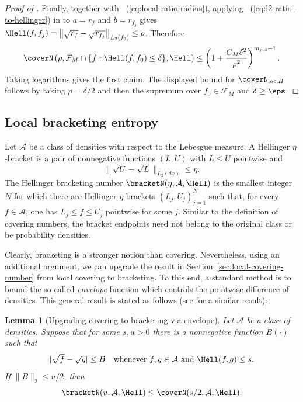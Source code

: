 \documentclass[letterpaper,11pt]{article}
\newcommand{\eqref}[1]{~(\ref{#1})}
\newcommand{\calF}{{\mathcal{F}}}
\newtheorem{lemma}[theorem]{Lemma}
\theoremstyle{definition}
\begin{document}
\begin{proof}[Proof of ]
Finally, together with \eqref{eq:local-ratio-radius}, applying 
\eqref{eq:l2-ratio-to-hellinger} in 
 to $a=r_f$ and $b=r_{f_j}$ gives
$\Hell(f,f_j)
=\left\|\sqrt{r_f}-\sqrt{r_{f_j}}\right\|_{L_2(f_0)}
\le \rho$. 
Therefore
\[
\coverN\left(\rho,
\calF_M\cap\{f:\Hell(f,f_0)\le\delta\},\Hell\right)
\le
\left(1+\frac{C_M\delta^2}{\rho^2}\right)^{m_{\rho,\delta}+1}.
\]
Taking logarithms gives the first claim.  The displayed bound for
$\coverN_{\mathrm{loc},H}$ follows by taking $\rho=\delta/2$ and then the
supremum over $f_0\in\calF_M$ and $\delta\ge\eps$.
\end{proof}




\subsection{Local bracketing entropy}
\label{sec:local-bracketing-number}

Let $\mathcal A$ be a class of densities with respect to the Lebesgue measure.
A Hellinger $\eta$-bracket is a pair of nonnegative functions $(L,U)$ with
$L\le U$ pointwise and
\[
\|\sqrt U-\sqrt L\|_{L_2(dx)}\le \eta .
\]
The Hellinger bracketing number $\bracketN(\eta,\mathcal A,\Hell)$ is the
smallest integer $N$ for which there are Hellinger $\eta$-brackets
$(L_j,U_j)_{j=1}^N$ such that, for every $f\in\mathcal A$, one has
$L_j\le f\le U_j$ pointwise for some $j$.  
Similar to the definition of covering numbers, the bracket endpoints
need not belong to the original class or be probability densities.

Clearly, bracketing is a stronger notion than covering. Nevertheless,
using an additional argument, we can upgrade the result in Section~\ref{sec:local-covering-number} from local covering to bracketing. To this end, a standard method is to bound the so-called \emph{envelope} function which controls the pointwise difference of densities. This general result is stated as follows (see \cite[Theorem 2.7.11]{wellner2013weak} for a similar result):

\begin{lemma}[Upgrading covering to bracketing via envelope]
\label{lmm:cover-to-bracket-full}
Let $\mathcal A$ be a class of densities.  Suppose that for some
$s,u>0$ there is a nonnegative function $B(\cdot)$ such that
\[
|\sqrt f-\sqrt g|\le B
\quad\text{whenever }f,g\in\mathcal A\text{ and }\Hell(f,g)\le s.
\]
If $\|B\|_2\le u/2$, then
\[
\bracketN(u,\mathcal A,\Hell)
\le
\coverN(s/2,\mathcal A,\Hell).
\]
\end{lemma}
\end{document}
